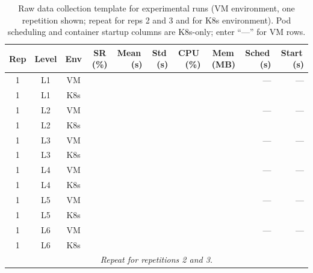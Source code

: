 \begin{appendices}
\begin{table}[H]
  \centering
  \caption{Raw data collection template for experimental runs (VM environment, one repetition shown; repeat for reps 2 and 3 and for K8s environment).
  Pod scheduling and container startup columns are K8s-only; enter ``---'' for VM rows.}
  \label{tab:data-template}
  \footnotesize
  \setlength{\tabcolsep}{4pt}
  \begin{tabularx}{\textwidth}{c c c r r r r r r r}
    \toprule
    \textbf{Rep} & \textbf{Level} & \textbf{Env} & \textbf{SR\,(\%)} & \textbf{Mean\,(s)} & \textbf{Std\,(s)} & \textbf{CPU\,(\%)} & \textbf{Mem\,(MB)} & \textbf{Sched\,(s)} & \textbf{Start\,(s)} \\
    \midrule
    1 & L1  & VM  & & & & & & --- & --- \\
    1 & L1  & K8s & & & & & & & \\
    1 & L2  & VM  & & & & & & --- & --- \\
    1 & L2  & K8s & & & & & & & \\
    1 & L3  & VM  & & & & & & --- & --- \\
    1 & L3  & K8s & & & & & & & \\
    1 & L4  & VM  & & & & & & --- & --- \\
    1 & L4  & K8s & & & & & & & \\
    1 & L5  & VM  & & & & & & --- & --- \\
    1 & L5  & K8s & & & & & & & \\
    1 & L6  & VM  & & & & & & --- & --- \\
    1 & L6  & K8s & & & & & & & \\
    \midrule
    \multicolumn{10}{c}{\emph{Repeat for repetitions 2 and 3.}} \\
    \bottomrule
  \end{tabularx}
\end{table}


\end{appendices}
